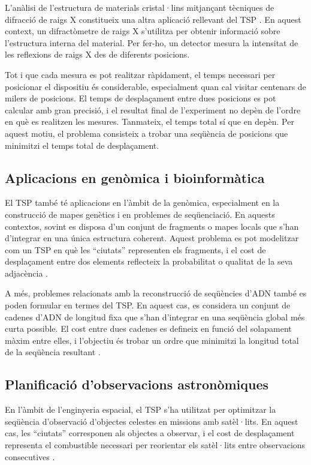 \documentclass[a4paper,12pt,twoside]{ThesisStyle}
\begin{document}
L'anàlisi de l'estructura de materials cristal·lins mitjançant tècniques de difracció de raigs X constitueix una altra aplicació rellevant del TSP \cite{bland1989large}. En aquest context, un difractòmetre de raigs X s'utilitza per obtenir informació sobre l'estructura interna del material. Per fer-ho, un detector mesura la intensitat de les reflexions de raigs X des de diferents posicions.

Tot i que cada mesura es pot realitzar ràpidament, el temps necessari per posicionar el dispositiu és considerable, especialment quan cal visitar centenars de milers de posicions. El temps de desplaçament entre dues posicions es pot calcular amb gran precisió, i el resultat final de l'experiment no depèn de l'ordre en què es realitzen les mesures. Tanmateix, el temps total sí que en depèn. Per aquest motiu, el problema consisteix a trobar una seqüència de posicions que minimitzi el temps total de desplaçament.

\subsection{Aplicacions en genòmica i bioinformàtica}

El TSP també té aplicacions en l'àmbit de la genòmica, especialment en la construcció de mapes genètics i en problemes de seqüenciació. En aquests contextos, sovint es disposa d'un conjunt de fragments o mapes locals que s'han d'integrar en una única estructura coherent. Aquest problema es pot modelitzar com un TSP en què les ``ciutats'' representen els fragments, i el cost de desplaçament entre dos elements reflecteix la probabilitat o qualitat de la seva adjacència \cite{agarwala2000radiation, stewart2001mouse}.

A més, problemes relacionats amb la reconstrucció de seqüències d'ADN també es poden formular en termes del TSP. En aquest cas, es considera un conjunt de cadenes d'ADN de longitud fixa que s'han d'integrar en una seqüència global més curta possible. El cost entre dues cadenes es defineix en funció del solapament màxim entre elles, i l'objectiu és trobar un ordre que minimitzi la longitud total de la seqüència resultant \cite{pevzner2000computational}.

\subsection{Planificació d'observacions astronòmiques}

En l'àmbit de l'enginyeria espacial, el TSP s'ha utilitzat per optimitzar la seqüència d'observació d'objectes celestes en missions amb satèl·lits. En aquest cas, les ``ciutats'' corresponen als objectes a observar, i el cost de desplaçament representa el combustible necessari per reorientar els satèl·lits entre observacions consecutives \cite{spears2000fuel}.
\end{document}
